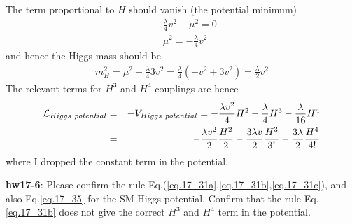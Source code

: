 \documentclass[12pt]{article}
\begin{document}
   The term proportional to $H$ should vanish (the potential minimum)
\begin{eqnarray}
  && \frac{\lambda}{4} v^2 + \mu^2 = 0 \label{eq.17_33a} \\
  && \mu^2 = -\frac{\lambda}{4} v^2 \label{eq.17_33b}
\end{eqnarray}
  and hence the Higgs mass should be
\begin{eqnarray}
  m_H^2 = \mu^2 + \frac{\lambda}{4} 3v^2
  = \frac{\lambda}{4} (-v^2 + 3v^2)
  = \frac{\lambda}{2} v^2 \label{eq.17_34}
\end{eqnarray}
  The relevant terms for $H^3$ and $H^4$ couplings are hence
\begin{eqnarray}
  {\cal L}_{Higgs~potential}
  &=& -V_{Higgs~potential}
  = -\frac{\lambda v^2}{4} H^2
    -\frac{\lambda}{4} H^3
    -\frac{\lambda}{16} H^4 \\
  &=& -\frac{\lambda v^2}{2}  \frac{H^2}{2}
    -\frac{3 \lambda v}{2}   \frac{H^3}{3!}
    -\frac{3 \lambda }{2}   \frac{H^4}{4!} \label{eq.17_35}
\end{eqnarray}
  where I dropped the constant term in the potential.

{\bf hw17-6}: Please confirm the rule Eq.(\ref{eq.17_31a},\ref{eq.17_31b},\ref{eq.17_31c}), and also Eq.\ref{eq.17_35} for the SM
  Higgs potential. Confirm that the rule Eq.\ref{eq.17_31b} does not give the correct $H^3$ and $H^4$ term in the potential.
\end{document}
